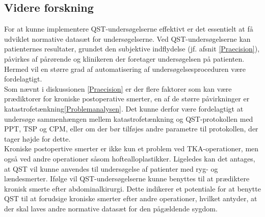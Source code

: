 \subsection{Videre forskning}
For at kunne implementere QST-undersøgelserne effektivt er det essentielt at få udviklet normative datasæt for undersøgelserne.  Ved QST-undersøgelserne kan patienternes resultater, grundet den subjektive indflydelse (jf. afsnit \ref{Praecision}), påvirkes af pårørende og klinikeren der foretager undersøgelsen på patienten. Hermed vil en større grad af automatisering af undersøgelsesproceduren være fordelagtigt. \\
Som nævnt i diskussionen \ref{Praecision} er der flere faktorer som kan være prædiktorer for kroniske postoperative smerter, en af de større påvirkninger er katastrofetænkning\ref{Problemanalysen}. Det kunne derfor være fordelagtigt at undersøge sammenhængen mellem katastrofetænkning og QST-protokollen med PPT, TSP og CPM, eller om der bør tilføjes andre parametre til protokollen, der tager højde for dette.\\
Kroniske postopertive smerter er ikke kun et problem ved TKA-operationer, men også ved andre operationer såsom hoftealloplastikker. \citep{Suokas2012} Ligeledes kan det antages, at QST vil kunne anvendes til undersøgelse af patienter med ryg- og lændesmerter. Ifølge  vil QST-undersøgelserne kunne benyttes til at prædiktere kronisk smerte efter abdominalkirurgi. Dette indikerer et potentiale for at benytte QST til at forudsige kroniske smerter efter andre operationer, hvilket antyder, at der skal laves andre normative datasæt for den pågældende sygdom.  